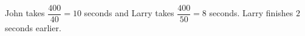 John takes $\dfrac{400}{40}=10$ seconds and Larry takes $\dfrac{400}{50}=8$ seconds. Larry finishes $\boxed2$ seconds earlier.
